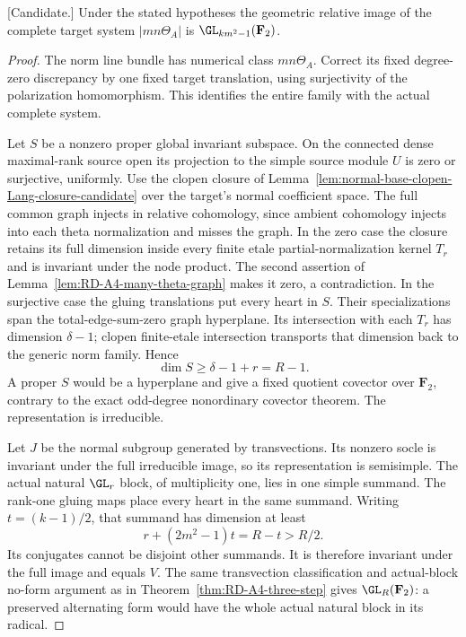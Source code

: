 \begin{theorem}
\label{thm:good-theta-odd-norm-step-candidate}
\textup{[Candidate.]}
Under the stated hypotheses the geometric relative image of the
complete target system $|mn\Theta_A|$ is
$\GL_{km^2-1}(\mathbf F_2)$.
\end{theorem}
\begin{proof}
The norm line bundle has numerical class $mn\Theta_A$.
Correct its fixed degree-zero discrepancy by one fixed target
translation, using surjectivity of the polarization homomorphism.
This identifies the entire family with the actual complete system.

Let $S$ be a nonzero proper global invariant subspace. On the
connected dense maximal-rank source open its projection to the
simple source module $U$ is zero or surjective, uniformly.
Use the clopen closure of
Lemma~\ref{lem:normal-base-clopen-Lang-closure-candidate} over the
target's normal coefficient space. The full common graph injects
in relative cohomology, since ambient cohomology injects into each
theta normalization and misses the graph.
In the zero case the closure retains its full dimension inside
every finite etale partial-normalization kernel $T_r$ and is
invariant under the node product. The second assertion of
Lemma~\ref{lem:RD-A4-many-theta-graph} makes it zero, a contradiction.
In the surjective case the gluing translations put every heart
in $S$. Their specializations span the total-edge-sum-zero graph
hyperplane. Its intersection with each $T_r$ has dimension
$\delta-1$; clopen finite-etale intersection transports that
dimension back to the generic norm family. Hence
\[
                    \dim S\ge\delta-1+r=R-1.
\]
A proper $S$ would be a hyperplane and give a fixed quotient
covector over $\mathbf F_2$, contrary to the exact odd-degree
nonordinary covector theorem. The representation is irreducible.

Let $J$ be the normal subgroup generated by transvections.
Its nonzero socle is invariant under the full irreducible image,
so its representation is semisimple. The actual natural
$\GL_r$ block, of multiplicity one, lies in one simple summand.
The rank-one gluing maps place every heart in the same summand.
Writing $t=(k-1)/2$, that summand has dimension at least
\[
                r+(2m^2-1)t=R-t>R/2.
\]
Its conjugates cannot be disjoint other summands. It is therefore
invariant under the full image and equals $V$.
The same transvection classification and actual-block no-form
argument as in Theorem~\ref{thm:RD-A4-three-step} gives
$\GL_R(\mathbf F_2)$: a preserved alternating form would have
the whole actual natural block in its radical.
\end{proof}

